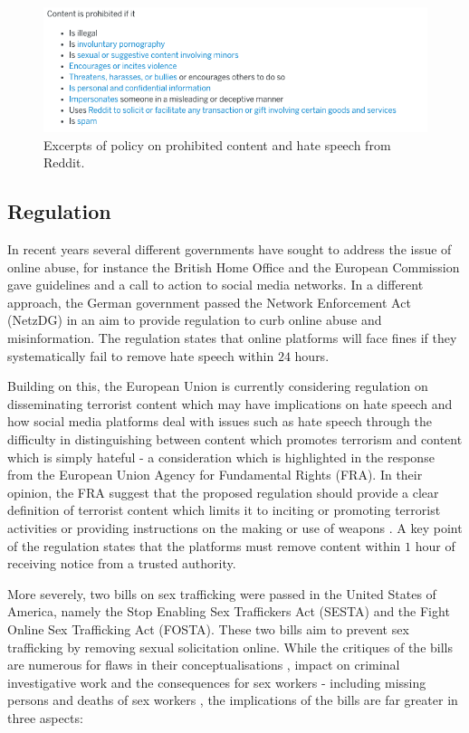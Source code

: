 \begin{figure}[!htb]
  \centering
  \includegraphics[width=\textwidth]{Chapter2/Figs/Reddit.png}
  \caption{Excerpts of policy on prohibited content and hate speech from  Reddit.}
  \label{fig:reddit_pol}
\end{figure}

\subsection{Regulation}
In recent years several different governments have sought to address the issue of online abuse, for instance the British Home Office \citep{HomeOffice:2016} and the European Commission \citep{EUCommission:2016} gave guidelines and a call to action to social media networks.
In a different approach, the German government passed the Network Enforcement Act (NetzDG) \citep{NetzDG:2017} in an aim to provide regulation to curb online abuse and misinformation.
The regulation states that online platforms will face fines if they systematically fail to remove hate speech within $24$ hours.

Building on this, the European Union is currently considering regulation on disseminating terrorist content which may have implications on hate speech and how social media platforms deal with issues such as hate speech \citep{EUCommission:2018} through the difficulty in distinguishing between content which promotes terrorism and content which is simply hateful - a consideration which is highlighted in the response from the European Union Agency for Fundamental Rights (FRA).
In their opinion, the FRA suggest that the proposed regulation should provide a clear definition of terrorist content which limits it to inciting or promoting terrorist activities or providing instructions on the making or use of weapons \citep{FRA:2019}.
A key point of the regulation states that the platforms must remove content within $1$ hour of receiving notice from a trusted authority.

More severely, two bills on sex trafficking were passed in the United States of America, namely the Stop Enabling Sex Traffickers Act (SESTA) and the Fight Online Sex Trafficking Act (FOSTA).
These two bills aim to prevent sex trafficking by removing sexual solicitation online.
While the critiques of the bills are numerous for flaws in their conceptualisations \citep{Romano:2018}, impact on criminal investigative work \citep{Q:2018} and the consequences for sex workers - including missing persons and deaths of sex workers \citep{Blue:2018,Simon:2018}, the implications of the bills are far greater in three aspects:

